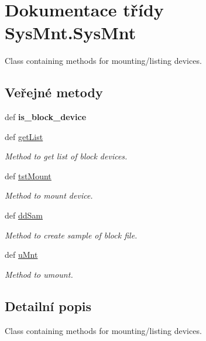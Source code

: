 \hypertarget{classSysMnt_1_1SysMnt}{\section{Dokumentace třídy Sys\-Mnt.\-Sys\-Mnt}
\label{classSysMnt_1_1SysMnt}
}


Class containing methods for mounting/listing devices.  


\subsection*{Veřejné metody}
\begin{DoxyCompactItemize}
\item 
\hypertarget{classSysMnt_1_1SysMnt_ae5cf3574dd0a7508c9d84184dccf55f1}{def {\bfseries is\-\_\-block\-\_\-device}}\label{classSysMnt_1_1SysMnt_ae5cf3574dd0a7508c9d84184dccf55f1}

\item 
def \hyperlink{classSysMnt_1_1SysMnt_a5e4cb1666ae4827b9824b11b0fabbadf}{get\-List}
\begin{DoxyCompactList}\small\item\em Method to get list of block devices. \end{DoxyCompactList}\item 
def \hyperlink{classSysMnt_1_1SysMnt_a3fab8f0e7fa379fe5a416d9a962d0870}{tst\-Mount}
\begin{DoxyCompactList}\small\item\em Method to mount device. \end{DoxyCompactList}\item 
def \hyperlink{classSysMnt_1_1SysMnt_a0d75f68939cb5bb90aca5f5fc480c81e}{dd\-Sam}
\begin{DoxyCompactList}\small\item\em Method to create sample of block file. \end{DoxyCompactList}\item 
def \hyperlink{classSysMnt_1_1SysMnt_ab060ce00b125e74ab01c872c95ffb3f1}{u\-Mnt}
\begin{DoxyCompactList}\small\item\em Method to umount. \end{DoxyCompactList}\end{DoxyCompactItemize}


\subsection{Detailní popis}
Class containing methods for mounting/listing devices. 

